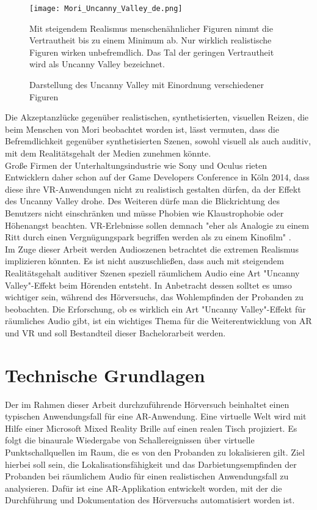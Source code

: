 \begin{figure}[H]
\centering
\texttt{[image: Mori\_Uncanny\_Valley\_de.png]}
\caption{Darstellung des \glqq Uncanny Valley \grqq{} mit Einordnung verschiedener Figuren} 
Mit steigendem Realismus menschenähnlicher Figuren nimmt die Vertrautheit bis zu einem Minimum ab. Nur wirklich realistische Figuren wirken unbefremdlich. Das Tal der geringen Vertrautheit wird als \glqq Uncanny Valley \grqq{}bezeichnet. 
\label{fig:Mori_Uncynn_Valley_de}
\end{figure}


Die Akzeptanzlücke gegenüber realistischen, synthetisierten, visuellen Reizen, die beim Menschen von Mori beobachtet worden ist, lässt vermuten, dass die Befremdlichkeit gegenüber synthetisierten Szenen, sowohl visuell als auch auditiv, mit dem Realitätsgehalt der Medien zunehmen könnte. \\ 

Große Firmen der Unterhaltungsindustrie wie Sony und Oculus rieten Entwicklern daher schon auf der Game Developers Conference in Köln 2014, dass diese ihre VR-Anwendungen nicht zu realistisch gestalten dürfen, da der Effekt des \glqq Uncanny Valley \grqq{} drohe. Des Weiteren dürfe man die Blickrichtung des Benutzers nicht einschränken und müsse Phobien wie Klaustrophobie oder Höhenangst beachten. VR-Erlebnisse sollen demnach "eher als Analogie zu einem Ritt durch einen Vergnügungspark begriffen werden als zu einem Kinofilm" \cite{Gieselmann}. \\
 
Im Zuge dieser Arbeit werden Audioszenen betrachtet die extremen Realismus implizieren könnten. Es ist nicht auszuschließen, dass auch mit steigendem Realitätsgehalt auditiver Szenen speziell räumlichem Audio eine Art "Uncanny Valley"-Effekt beim Hörenden entsteht. In Anbetracht dessen solltet es umso wichtiger sein, während des Hörversuchs, das Wohlempfinden der Probanden zu beobachten.  Die Erforschung, ob es wirklich ein Art "Uncanny Valley"-Effekt für räumliches Audio gibt, ist ein wichtiges Thema für die Weiterentwicklung von AR und VR und soll Bestandteil dieser Bachelorarbeit werden. 
 
 \chapter{Technische Grundlagen}
Der im Rahmen dieser Arbeit durchzuführende Hörversuch beinhaltet einen typischen Anwendungsfall für eine AR-Anwendung. Eine virtuelle Welt wird mit Hilfe einer Microsoft Mixed Reality Brille auf einen realen Tisch projiziert.  Es folgt die binaurale Wiedergabe von Schallereignissen über virtuelle Punktschallquellen im Raum, die es von den Probanden zu lokalisieren gilt. Ziel hierbei soll sein, die Lokalisationsfähigkeit und das Darbietungsempfinden der Probanden bei räumlichem Audio für einen realistischen Anwendungsfall zu analysieren. Dafür ist eine AR-Applikation entwickelt worden, mit der die Durchführung und Dokumentation des Hörversuchs automatisiert worden ist.

